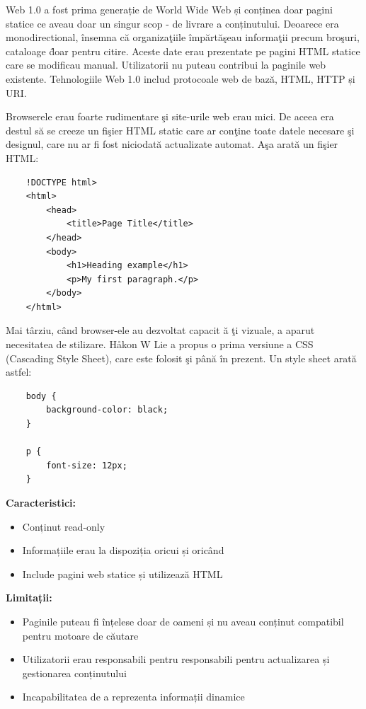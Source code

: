 \documentclass[12pt, a4paper]{report}
\begin{document}
Web 1.0 a fost prima generație de World Wide Web și conținea doar pagini statice ce aveau doar un singur scop - de livrare a conținutului. Deoarece era monodirectional, \^ insemna c\u a organiza\c tiile \^ imp\u art\u a\c seau informa\c tii precum bro\c suri, cataloage \^ doar pentru citire. Aceste date erau prezentate pe pagini HTML statice care se modificau manual. Utilizatorii nu puteau contribui la paginile web existente. Tehnologiile Web 1.0 includ protocoale web de bază, HTML, HTTP și URI.

Browserele erau foarte rudimentare \c si site-urile web erau mici. De aceea era destul s\u a se creeze un fi\c sier HTML static care ar con\c tine toate datele necesare \c si designul, care nu ar fi fost niciodat\u a actualizate automat. A\c sa arat\u a un fi\c sier HTML:
\begin{lstlisting}
	!DOCTYPE html>
	<html>
		<head>
			<title>Page Title</title>
		</head>
		<body>
			<h1>Heading example</h1>
			<p>My first paragraph.</p>
		</body>
	</html>
\end{lstlisting}

Mai t\^ arziu, c\^ and browser-ele au dezvoltat capacit \u a \c ti vizuale, a aparut necesitatea de stilizare. Håkon W Lie a propus o prima versiune a CSS (Cascading Style Sheet), care este folosit \c si p\^ an\u a \^ in prezent. Un style sheet arat\u a astfel:
\begin{lstlisting}
	body {
		background-color: black;
	}

	p {
		font-size: 12px;
	}
\end{lstlisting}

\newpage
\textbf{Caracteristici:}
\begin{itemize}
	\item Conținut read-only
	\item Informațiile erau la dispoziția oricui și oricând
	\item Include pagini web statice și utilizează HTML
\end{itemize}


\textbf{Limitații:}
\begin{itemize}
	\item Paginile puteau fi înțelese doar de oameni și nu aveau conținut compatibil pentru motoare de căutare
	\item Utilizatorii erau responsabili pentru responsabili pentru actualizarea și gestionarea conținutului
	\item Incapabilitatea de a reprezenta informații dinamice
\end{itemize}
\end{document}
